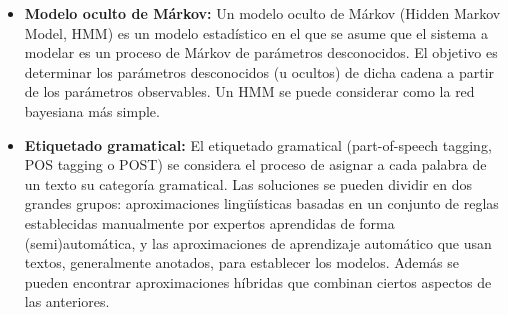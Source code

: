 \documentclass[spanish,12pt, a4paper,twoside]{paper}
\begin{document}
\begin{itemize}
	\item \textbf{Modelo oculto de Márkov:} Un modelo oculto de Márkov (Hidden Markov Model, HMM) es un modelo estadístico en el que se asume que el sistema a modelar es un proceso de Márkov de parámetros desconocidos. El objetivo es determinar los parámetros desconocidos (u ocultos) de dicha cadena a partir de los parámetros observables. Un HMM se puede considerar como la red bayesiana más simple. 
	\item \textbf{Etiquetado gramatical:} El etiquetado gramatical (part-of-speech tagging, POS tagging o POST) se considera el proceso de asignar a cada palabra de un texto su categoría gramatical. Las soluciones se pueden dividir en dos grandes grupos: aproximaciones lingüísticas basadas en un conjunto de reglas establecidas manualmente por expertos aprendidas de forma (semi)automática, y las aproximaciones de aprendizaje automático que usan textos, generalmente anotados, para establecer los modelos. Además se pueden encontrar aproximaciones híbridas que combinan ciertos aspectos de las anteriores.

\end{itemize}



\end{document}
